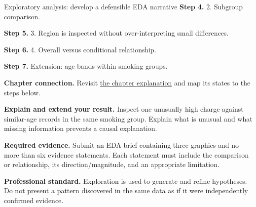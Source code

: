 \begin{labproject}{Exploratory analysis: develop a defensible EDA narrative}
\noindent\textbf{Step 4.} 2. Subgroup comparison.


\noindent\textbf{Step 5.} 3. Region is inspected without over-interpreting small differences.


\noindent\textbf{Step 6.} 4. Overall versus conditional relationship.


\noindent\textbf{Step 7.} Extension: age bands within smoking groups.

\textbf{Chapter connection.} Revisit \hyperref[ch:eda]{the chapter explanation} and map its states to the steps below.


\begin{verification}
\textbf{Explain and extend your result.} Inspect one unusually high charge against similar-age records in the same smoking group. Explain what is unusual and what missing information prevents a causal explanation.


\textbf{Required evidence.} Submit an EDA brief containing three graphics and no more than six evidence statements. Each statement must include the comparison or relationship, its direction/magnitude, and an appropriate limitation.

\textbf{Professional standard.} Exploration is used to generate and refine hypotheses. Do not present a pattern discovered in the same data as if it were independently confirmed evidence.
\end{verification}
\end{labproject}
